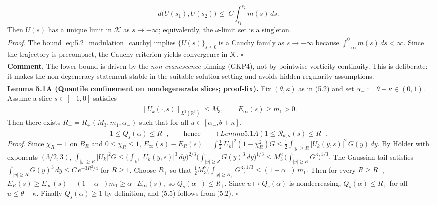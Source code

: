 \documentclass[
  11pt,
]{article}
\begin{document}
\begin{longtable}[]{@{}
  >{\raggedright\arraybackslash}p{}@{}}
\begin{equation}
d\big(U(s_1),U(s_2)\big)\ \le\ C\int_{s_1}^{s_2} m(s)\,ds.
\tag{5.2}\label{eq:5.2_modulation_cauchy}
\end{equation}
Then \(U(s)\) has a unique limit in \(\mathcal K\) as \(s\to-\infty\); equivalently, the \(\omega\)-limit set is a singleton. \\
\emph{Proof.} The bound \eqref{eq:5.2_modulation_cauchy} implies \(\{U(s)\}_{s\le 0}\) is a Cauchy family as \(s\to-\infty\) because \(\int_{-\infty}^{0} m(s)\,ds<\infty\). Since the trajectory is precompact, the Cauchy criterion yields convergence in \(\mathcal K\). \(\square\) \\
\textbf{Comment.} The lower bound is driven by the \emph{non-evanescence} pinning (GKP4), not by pointwise vorticity continuity. This is deliberate: it makes the non-degeneracy statement stable in the suitable-solution setting and avoids hidden regularity assumptions. \\
\textbf{Lemma 5.1A (Quantile confinement on nondegenerate slices; proof-fix).} Fix \((\theta,\kappa)\) as in (5.2) and set \(\alpha_-:=\theta-\kappa\in(0,1)\). Assume a slice \(s\in[-1,0]\) satisfies \\
\begin{equation}
\|U_k(\cdot,s)\|_{L^3(\mathbb R^3)}\le M_3,
\qquad
E_\infty(s)\ge m_1>0.
\tag{5.4}
\end{equation}
Then there exists \(R_+=R_+(M_3,m_1,\alpha_-)\) such that for all \(u\in[\alpha_-,\theta+\kappa]\), \\
\begin{equation}
1\le Q_s(\alpha)\le R_+,
\qquad\text{hence}\qquad (Lemma 5.1A)
1\le \mathcal R_{\theta,\kappa}(s)\le R_+.
\tag{5.5}
\end{equation}
\emph{Proof.} Since \(\chi_R\equiv 1\) on \(B_{R}\) and \(0\le\chi_R\le 1\), \(
E_\infty(s)-E_R(s)
=\int \tfrac12|U_k|^2(1-\chi_R^2)G
\le \tfrac12\int_{|y|\ge R}|U_k(y,s)|^2\,G(y)\,dy.
\) By Hölder with exponents \((3/2,3)\), \(
\int_{|y|\ge R}|U_k|^2G
\le \bigg(\int_{\mathbb R^3}|U_k(y,s)|^3\,dy\bigg)^{2/3}
\bigg(\int_{|y|\ge R}G(y)^3\,dy\bigg)^{1/3}
\le M_3^2\,\bigg(\int_{|y|\ge R}G^3\bigg)^{1/3}.
\) The Gaussian tail satisfies \(\int_{|y|\ge R}G(y)^3\,dy\le C\,e^{-3R^2/4}\) for \(R\ge 1\). Choose \(R_+\) so that \(
\tfrac12 M_3^2\Big(\int_{|y|\ge R_+}G^3\Big)^{1/3}\le (1-\alpha_-)\,m_1.
\) Then for every \(R\ge R_+\), \(
E_R(s)\ge E_\infty(s)-(1-\alpha_-)m_1\ge \alpha_-\,E_\infty(s),
\) so \(Q_s(\alpha_-)\le R_+\). Since \(u\mapsto Q_s(\alpha)\) is nondecreasing, \(Q_s(\alpha)\le R_+\) for all \(u\le \theta+\kappa\). Finally \(Q_s(\alpha)\ge 1\) by definition, and (5.5) follows from (5.2). \(\square\) \\

\end{longtable}
\end{document}
